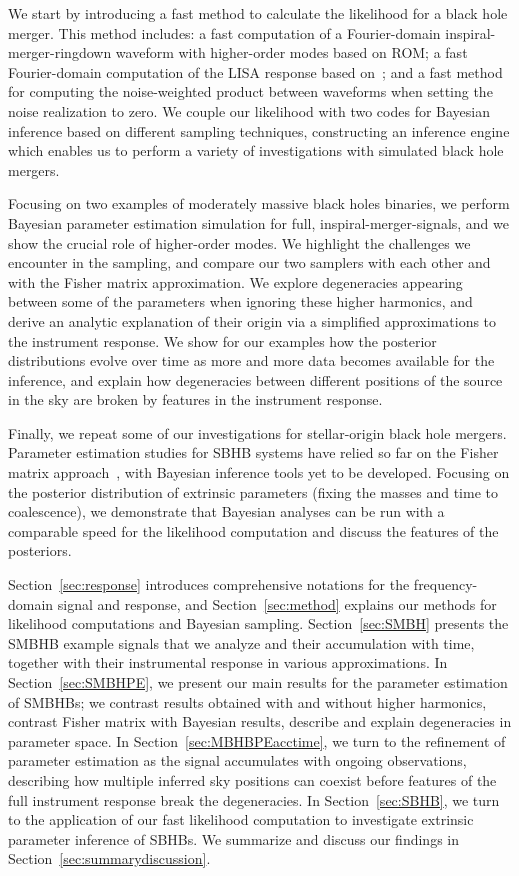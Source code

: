\documentclass[aps,showpacs,twocolumn,prd,superscriptaddress,nofootinbib]{revtex4-1}
\begin{document}
We start by introducing a fast method to calculate the likelihood for a black hole merger. This method includes: a fast computation of a Fourier-domain inspiral-merger-ringdown waveform with higher-order modes based on ROM; a fast Fourier-domain computation of the LISA response based on~\cite{MB18}; and a fast method for computing the noise-weighted product between waveforms when setting the noise realization to zero. We couple our likelihood with two codes for Bayesian inference based on different sampling techniques, constructing an inference engine which enables us to perform a variety of investigations with simulated black hole mergers.

Focusing on two examples of moderately massive black holes binaries, we perform Bayesian parameter estimation simulation for full, inspiral-merger-signals, and we show the crucial role of higher-order modes. We highlight the challenges we encounter in the sampling, and compare our two samplers with each other and with the Fisher matrix approximation. We explore degeneracies appearing between some of the parameters when ignoring these higher harmonics, and derive an analytic explanation of their origin via a simplified approximations to the instrument response. We show for our examples how the posterior distributions evolve over time as more and more data becomes available for the inference, and explain how degeneracies between different positions of the source in the sky are broken by features in the instrument response.

Finally, we repeat some of our investigations for stellar-origin black hole mergers. Parameter estimation studies for SBHB systems have relied so far on the Fisher matrix approach~\cite{Sesana16, Vitale16, Nishizawa+16a, Nishizawa+16b}, with Bayesian inference tools yet to be developed. Focusing on the posterior distribution of extrinsic parameters (fixing the masses and time to coalescence), we demonstrate that Bayesian analyses can be run with a comparable speed for the likelihood computation and discuss the features of the posteriors.

Section~\ref{sec:response} introduces comprehensive notations for the frequency-domain signal and response, and Section~\ref{sec:method} explains our methods for likelihood computations and Bayesian sampling. Section~\ref{sec:SMBH} presents the SMBHB example signals that we analyze and their accumulation with time, together with their instrumental response in various approximations. In Section~\ref{sec:SMBHPE}, we present our main results for the parameter estimation of SMBHBs; we contrast results obtained with and without higher harmonics, contrast Fisher matrix with Bayesian results, describe and explain degeneracies in parameter space. In Section~\ref{sec:MBHBPEacctime}, we turn to the refinement of parameter estimation as the signal accumulates with ongoing observations, describing how multiple inferred sky positions can coexist before features of the full instrument response break the degeneracies. In Section~\ref{sec:SBHB}, we turn to the application of our fast likelihood computation to investigate extrinsic parameter inference of SBHBs. We summarize and discuss our findings in Section~\ref{sec:summarydiscussion}.
\end{document}
